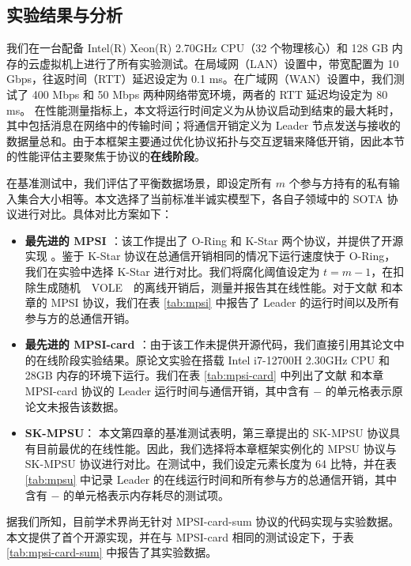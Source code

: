 \subsection{实验结果与分析}

我们在一台配备 Intel(R) Xeon(R) 2.70GHz CPU（32 个物理核心）和 128 GB 内存的云虚拟机上进行了所有实验测试。在局域网（LAN）设置中，带宽配置为 10 Gbps，往返时间（RTT）延迟设定为 0.1 ms。在广域网（WAN）设置中，我们测试了 400 Mbps 和 50 Mbps 两种网络带宽环境，两者的 RTT 延迟均设定为 80 ms。
在性能测量指标上，本文将运行时间定义为从协议启动到结束的最大耗时，其中包括消息在网络中的传输时间；将通信开销定义为 Leader 节点发送与接收的数据量总和。由于本框架主要通过优化协议拓扑与交互逻辑来降低开销，因此本节的性能评估主要聚焦于协议的\textbf{在线阶段}。

在基准测试中，我们评估了平衡数据场景，即设定所有 $m$ 个参与方持有的私有输入集合大小相等。本文选择了当前标准半诚实模型下，各自子领域中的 SOTA 协议进行对比。具体对比方案如下：

\begin{itemize}
    \item \textbf{最先进的 MPSI \cite{WuYC24}}：该工作提出了 O-Ring 和 K-Star 两个协议，并提供了开源实现 \cite{libOring}。鉴于 K-Star 协议在总通信开销相同的情况下运行速度快于 O-Ring，我们在实验中选择 K-Star 进行对比。我们将腐化阈值设定为 $t = m-1$，在扣除生成随机　VOLE　的离线开销后，测量并报告其在线性能。对于文献 \cite{WuYC24} 和本章的 MPSI 协议，我们在表 \ref{tab:mpsi} 中报告了 Leader 的运行时间以及所有参与方的总通信开销。
    \item \textbf{最先进的 MPSI-card \cite{ChenDGB22}}：由于该工作未提供开源代码，我们直接引用其论文中的在线阶段实验结果。原论文实验在搭载 Intel i7-12700H 2.30GHz CPU 和 28GB 内存的环境下运行。我们在表 \ref{tab:mpsi-card} 中列出了文献 \cite{ChenDGB22} 和本章 MPSI-card 协议的 Leader 运行时间与通信开销，其中含有 $-$ 的单元格表示原论文未报告该数据。
    \item \textbf{SK-MPSU}： 本文第四章的基准测试表明，第三章提出的 SK-MPSU 协议具有目前最优的在线性能。因此，我们选择将本章框架实例化的 MPSU 协议与 SK-MPSU 协议进行对比。在测试中，我们设定元素长度为 64 比特，并在表 \ref{tab:mpsu} 中记录 Leader 的在线运行时间和所有参与方的总通信开销，其中含有 $-$ 的单元格表示内存耗尽的测试项。
\end{itemize}

据我们所知，目前学术界尚无针对 MPSI-card-sum 协议的代码实现与实验数据。本文提供了首个开源实现，并在与 MPSI-card 相同的测试设定下，于表 \ref{tab:mpsi-card-sum} 中报告了其实验数据。

